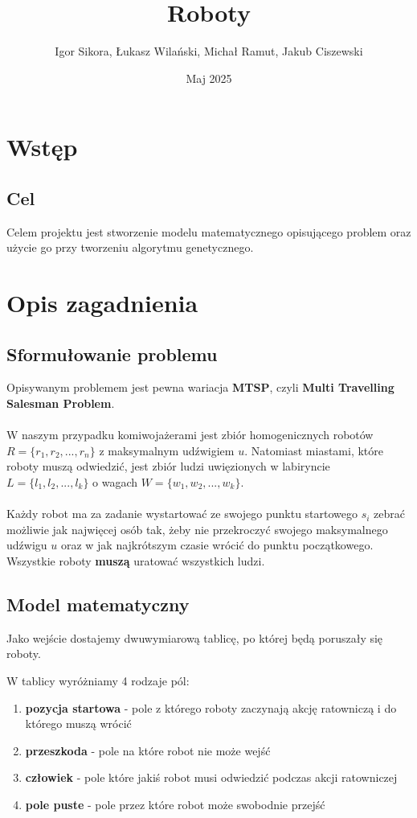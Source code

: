 \documentclass[12pt]{article}
\title{\textbf{Roboty}}
\author{Igor Sikora, Łukasz Wilański, Michał Ramut, Jakub Ciszewski}
\date{Maj 2025}
\begin{document}
\maketitle

\section{Wstęp}

\subsection{Cel}
Celem projektu jest stworzenie modelu matematycznego opisującego problem oraz użycie go przy tworzeniu algorytmu genetycznego.

\section{Opis zagadnienia}

\subsection{Sformułowanie problemu}
Opisywanym problemem jest pewna wariacja \textbf{MTSP}, czyli \textbf{Multi Travelling Salesman Problem}. 
\\\\
W naszym przypadku komiwojażerami jest zbiór homogenicznych robotów $R=\{r_1,r_2,...,r_n\}$ z maksymalnym udźwigiem $u$. Natomiast miastami, które roboty muszą odwiedzić, jest zbiór ludzi uwięzionych w labiryncie $L=\{l_1,l_2,...,l_k\}$ o wagach $W=\{w_1,w_2,...,w_k\}$.
\\\\
Każdy robot ma za zadanie wystartować ze swojego punktu startowego $s_i$ zebrać możliwie jak najwięcej osób tak, żeby nie przekroczyć swojego maksymalnego udźwigu $u$ oraz w jak najkrótszym czasie wrócić do punktu początkowego. Wszystkie roboty \textbf{muszą} uratować wszystkich ludzi.

\subsection{Model matematyczny}

Jako wejście dostajemy dwuwymiarową tablicę, po której będą poruszały się roboty.

\vspace{2mm}

W tablicy wyróżniamy 4 rodzaje pól:
\begin{enumerate}
    \item \textbf{pozycja startowa} - pole z którego roboty zaczynają akcję ratowniczą i do którego muszą wrócić
    \item \textbf{przeszkoda} - pole na które robot nie może wejść
    \item \textbf{człowiek} - pole które jakiś robot musi odwiedzić podczas akcji ratowniczej
    \item \textbf{pole puste} - pole przez które robot może swobodnie przejść
\end{enumerate}
\end{document}
